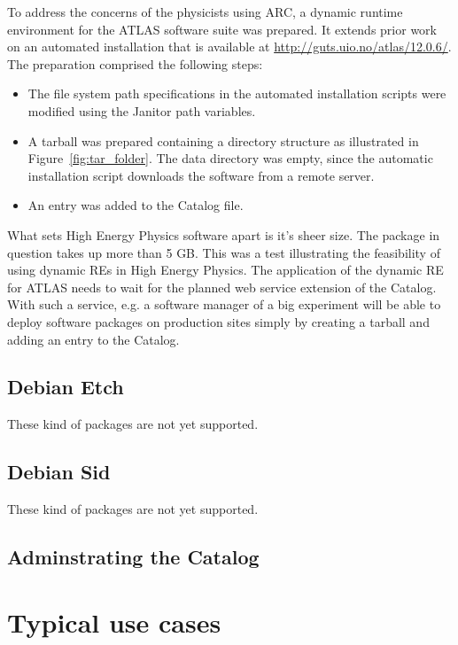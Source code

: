 To address the concerns of the physicists using ARC, a dynamic runtime environment for the
ATLAS software suite was prepared. It extends prior work on an automated installation that is available at
\href{http://guts.uio.no/atlas/12.0.6/}{http://guts.uio.no/atlas/12.0.6/}. The preparation comprised the following steps:
\begin{itemize}
    \item The file system path specifications in the automated installation scripts were modified using the Janitor
       path variables.
    \item A tarball was prepared containing a directory structure as illustrated in Figure~\ref{fig:tar_folder}. The data directory
       was empty, since the automatic installation script downloads the software from a remote server.
    \item An entry was added to the Catalog file.
\end{itemize}

What sets High Energy Physics software apart is it's sheer size. The package in question takes up more than
5 GB. This was a test illustrating the feasibility of using dynamic REs in High Energy Physics. The application
of the dynamic RE for ATLAS needs to wait for the planned web service extension of the Catalog. With such a
service, e.g. a software manager of a big experiment will be able to deploy software packages on production
sites simply by creating a tarball and adding an entry to the Catalog.


\subsection{Debian Etch}

These kind of packages are not yet supported.

\subsection{Debian Sid}

These kind of packages are not yet supported.

\subsection{Adminstrating the Catalog}

\section{Typical use cases}\label{sec:catalog}

